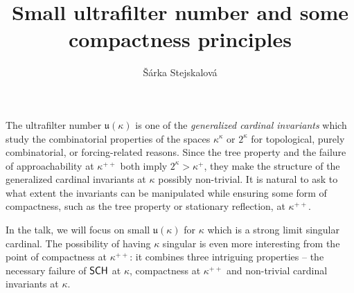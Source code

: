 \documentclass{amsart}
\title{Small ultrafilter number and some compactness principles}
\author{\v{S}\'{a}rka Stejskalov\'{a}}
\begin{document}
\maketitle
The ultrafilter number $\mathfrak{u}(\kappa)$ is one of the \emph{generalized cardinal invariants} which study the combinatorial properties of the spaces $\kappa^\kappa$ or $2^\kappa$ for topological, purely combinatorial, or forcing-related reasons. Since the tree property and the failure of approachability at $\kappa^{++}$ both imply $2^\kappa>\kappa^+$, they make the structure of the generalized cardinal invariants at $\kappa$ possibly non-trivial. It is natural to ask to what extent the invariants can be manipulated while ensuring some form of compactness, such as the tree property or stationary reflection, at $\kappa^{++}$.

In the talk, we will focus on small $\mathfrak{u}(\kappa)$ for $\kappa$ which is a strong limit singular cardinal. The possibility of having $\kappa$ singular is even more interesting from the point of compactness at $\kappa^{++}$: it combines three intriguing properties -- the necessary failure of $\sf SCH
$ at $\kappa$, compactness at $\kappa^{++}$ and non-trivial cardinal invariants at $\kappa$. 
\end{document}

